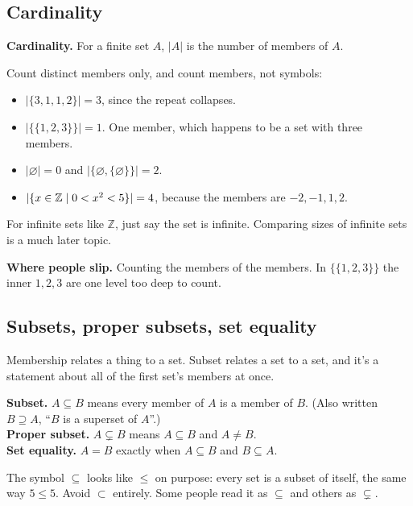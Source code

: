\subsection{Cardinality}

\begin{notebox}
\textbf{Cardinality.} For a finite set $A$, $|A|$ is the number of members of $A$.
\end{notebox}

Count distinct members only, and count members, not symbols:
\begin{itemize}
  \item $|\{3,1,1,2\}|=3$, since the repeat collapses.
  \item $|\{\{1,2,3\}\}|=1$. One member, which happens to be a set with three members.
  \item $|\varnothing|=0$ and $|\{\varnothing,\{\varnothing\}\}|=2$.
  \item $|\{x\in\mathbb{Z}\mathrel{|} 0<x^2<5\}|=4$, because the members are $-2,-1,1,2$.
\end{itemize}
For infinite sets like $\mathbb{Z}$, just say the set is infinite. Comparing sizes of infinite sets is a much later topic.

\textbf{Where people slip.} Counting the members of the members. In $\{\{1,2,3\}\}$ the inner $1,2,3$ are one level too deep to count.

\subsection{Subsets, proper subsets, set equality}

Membership relates a thing to a set. Subset relates a set to a set, and it's a statement about all of the first set's members at once.

\begin{notebox}
\textbf{Subset.} $A\subseteq B$ means every member of $A$ is a member of $B$. (Also written $B\supseteq A$, ``$B$ is a superset of $A$''.)\\
\textbf{Proper subset.} $A\subsetneq B$ means $A\subseteq B$ and $A\neq B$.\\
\textbf{Set equality.} $A=B$ exactly when $A\subseteq B$ and $B\subseteq A$.
\end{notebox}

The symbol $\subseteq$ looks like $\leq$ on purpose: every set is a subset of itself, the same way $5\leq5$. Avoid $\subset$ entirely. Some people read it as $\subseteq$ and others as $\subsetneq$.


